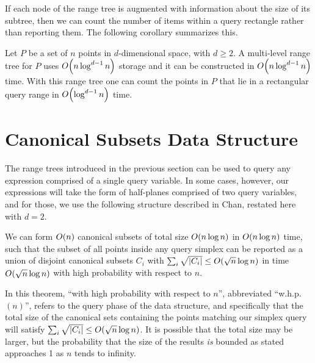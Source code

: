 If each node of the range tree is augmented with information about the size of its subtree, then we can count the number of items within a query rectangle rather than reporting them. The following corollary summarizes this.

\begin{corollary}
\label{cor:rangetree}
Let $P$ be a set of $n$ points in $d$-dimensional space, with $d \geq 2$. A multi-level range tree for $P$ uses $O\!\left(n \log^{d-1}{n}\right)$ storage and it can be constructed in $O\!\left(n \log^{d-1}{n}\right)$ time. With this range tree one can count the points in $P$ that lie in a rectangular query range in $O\!\left(\log^{d-1}{n}\right)$ time.
\end{corollary}


\section{Canonical Subsets Data Structure}
\label{:prelim:chan}

The range trees introduced in the previous section can be used to query any expression comprised of a single query variable.  In some cases, however, our expressions will take the form of half-planes comprised of two query variables, and for those, we use the following structure described in Chan\cite{chan2012}, restated here with $d=2$.

\begin{theorem}
\label{th:chan}
We can form $O\!\left(n\right)$ canonical subsets of total size $O\!\left(n \log{n}\right)$ in $O\!\left(n \log{n}\right)$ time, such that the subset of all points inside any query simplex can be reported as a union of disjoint canonical subsets $C_i$ with $\sum_i{\sqrt{|C_i|}} \leq O\!\left(\sqrt{n}\log{n}\right)$ in time $O\!\left(\sqrt{n}\log{n}\right)$ with high probability with respect to $n$.
\end{theorem}

In this theorem, ``with high probability with respect to $n$'', abbreviated ``w.h.p. $(n)$'', refers to the query phase of the data structure, and specifically that the total size of the canonical sets containing the points matching our simplex query will satisfy $\sum_i{\sqrt{|C_i|}} \leq O\!\left(\sqrt{n}\log{n}\right)$.
It is possible that the total size may be larger, but the probability that the size of the results \emph{is} bounded as stated approaches 1 as $n$ tends to infinity.

